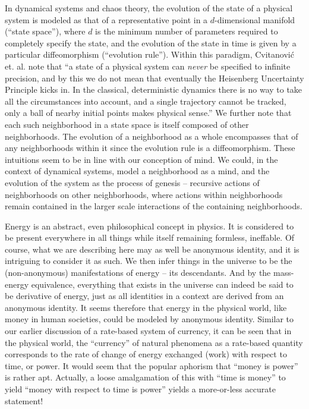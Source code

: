 \documentclass[pra,twocolumn,groupedaddress,10pt]{revtex4}
\theoremstyle{definition}
\begin{document}
In dynamical systems and chaos theory, the evolution of the state of a physical system is modeled as that of a representative point in a $d$-dimensional manifold (``state space''), where $d$ is the minimum number of parameters required to completely specify the state, and the evolution of the state in time is given by a particular diffeomorphism (``evolution rule''). Within this paradigm, Cvitanovi\'{c} et. al.\cite{chaosbook} note that ``a state of a physical system can \textit{never} be specified to infinite precision, and by this we do not mean that eventually the Heisenberg Uncertainty Principle kicks in. In the classical, deterministic dynamics there is no way to take all the circumstances into account, and a single trajectory cannot be tracked, only a ball of nearby initial points makes physical sense.'' We further note that each such neighborhood in a state space is itself composed of other neighborhoods. The evolution of a neighborhood as a whole encompasses that of any neighborhoods within it since the evolution rule is a diffeomorphism. These intuitions seem to be in line with our conception of mind. We could, in the context of dynamical systems, model a neighborhood as a mind, and the evolution of the system as the process of genesis -- recursive actions of neighborhoods on other neighborhoods, where actions within neighborhoods remain contained in the larger scale interactions of the containing neighborhoods.

Energy is an abstract, even philosophical concept in physics. It is considered to be present everywhere in all things while itself remaining formless, ineffable. Of course, what we are describing here may as well be anonymous identity, and it is intriguing to consider it as such. We then infer things in the universe to be the (non-anonymous) manifestations of energy -- its descendants. And by the mass-energy equivalence, everything that exists in the universe can indeed be said to be derivative of energy, just as all identities in a context are derived from an anonymous identity. It seems therefore that energy in the physical world, like money in human societies, could be modeled by anonymous identity. Similar to our earlier discussion of a rate-based system of currency, it can be seen that in the physical world, the ``currency'' of natural phenomena as a rate-based quantity corresponds to the rate of change of energy exchanged (work) with respect to time, or power. It would seem that the popular aphorism that ``money is power'' is rather apt. Actually, a loose amalgamation of this with ``time is money'' to yield ``money with respect to time is power'' yields a more-or-less accurate statement!
\end{document}
